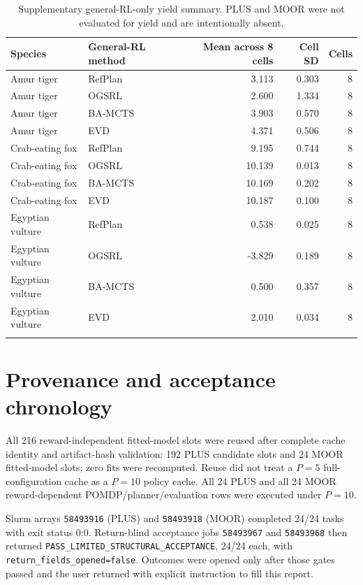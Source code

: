 \documentclass[10pt]{article}
\begin{document}
\begin{table}[ht]
\centering\small
\begin{tabular}{@{}llrrr@{}}
\toprule
Species & General-RL method & Mean across 8 cells & Cell SD & Cells \\
\midrule
Amur tiger & RefPlan & 3.113 & 0.303 & 8 \\
Amur tiger & OGSRL & 2.600 & 1.334 & 8 \\
Amur tiger & BA-MCTS & 3.903 & 0.570 & 8 \\
Amur tiger & EVD & 4.371 & 0.506 & 8 \\
\addlinespace[1.5pt]
Crab-eating fox & RefPlan & 9.195 & 0.744 & 8 \\
Crab-eating fox & OGSRL & 10.139 & 0.013 & 8 \\
Crab-eating fox & BA-MCTS & 10.169 & 0.202 & 8 \\
Crab-eating fox & EVD & 10.187 & 0.100 & 8 \\
\addlinespace[1.5pt]
Egyptian vulture & RefPlan & 0.538 & 0.025 & 8 \\
Egyptian vulture & OGSRL & -3.829 & 0.189 & 8 \\
Egyptian vulture & BA-MCTS & 0.500 & 0.357 & 8 \\
Egyptian vulture & EVD & 2.010 & 0.034 & 8 \\
\addlinespace[1.5pt]
\bottomrule
\end{tabular}
\caption{Supplementary general-RL-only yield summary. PLUS and MOOR were not evaluated for yield and are intentionally absent.}
\end{table}


\section{Provenance and acceptance chronology}
All 216 reward-independent fitted-model slots were reused after complete cache
identity and artifact-hash validation: 192 PLUS candidate slots and 24 MOOR
fitted-model slots; zero fits were recomputed.  Reuse did not treat a \(P=5\)
full-configuration cache as a \(P=10\) policy cache.  All 24 PLUS and all 24 MOOR
reward-dependent POMDP/planner/evaluation rows were executed under \(P=10\).

Slurm arrays \texttt{58493916} (PLUS) and \texttt{58493918} (MOOR) completed
24/24 tasks with exit status 0:0.  Return-blind acceptance jobs
\texttt{58493967} and \texttt{58493968} then returned
\texttt{PASS\_LIMITED\_STRUCTURAL\_ACCEPTANCE}, 24/24 each, with
\texttt{return\_fields\_opened=false}.  Outcomes were opened only after those
gates passed and the user returned with explicit instruction to fill this report.
\end{document}

